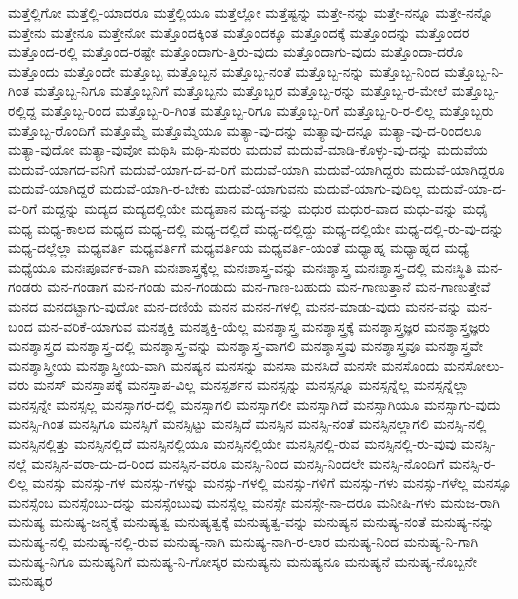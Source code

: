 {ಮತ್ತೆಲ್ಲಿಗೋ
ಮತ್ತೆಲ್ಲಿ-ಯಾದರೂ
ಮತ್ತೆಲ್ಲಿಯೂ
ಮತ್ತೆಲ್ಲೋ
ಮತ್ತೆಷ್ಟನ್ನು
ಮತ್ತೇ-ನನ್ನು
ಮತ್ತೇ-ನನ್ನೂ
ಮತ್ತೇ-ನನ್ನೊ
ಮತ್ತೇನು
ಮತ್ತೇನೂ
ಮತ್ತೇನೋ
ಮತ್ತೊಂದಕ್ಕಿಂತ
ಮತ್ತೊಂದಕ್ಕೂ
ಮತ್ತೊಂದಕ್ಕೆ
ಮತ್ತೊಂದನ್ನು
ಮತ್ತೊಂದರ
ಮತ್ತೊಂದ-ರಲ್ಲಿ
ಮತ್ತೊಂದ-ರಷ್ಟೇ
ಮತ್ತೊಂದಾಗು-ತ್ತಿರು-ವುದು
ಮತ್ತೊಂದಾಗು-ವುದು
ಮತ್ತೊಂದಾ-ದರೊ
ಮತ್ತೊಂದು
ಮತ್ತೊಂದೇ
ಮತ್ತೊಬ್ಬ
ಮತ್ತೊಬ್ಬನ
ಮತ್ತೊಬ್ಬ-ನಂತೆ
ಮತ್ತೊಬ್ಬ-ನನ್ನು
ಮತ್ತೊಬ್ಬ-ನಿಂದ
ಮತ್ತೊಬ್ಬ-ನಿ-ಗಿಂತ
ಮತ್ತೊಬ್ಬ-ನಿಗೂ
ಮತ್ತೊಬ್ಬನಿಗೆ
ಮತ್ತೊಬ್ಬನು
ಮತ್ತೊಬ್ಬರ
ಮತ್ತೊಬ್ಬ-ರನ್ನು
ಮತ್ತೊಬ್ಬ-ರ-ಮೇಲೆ
ಮತ್ತೊಬ್ಬ-ರಲ್ಲಿದ್ದ
ಮತ್ತೊಬ್ಬ-ರಿಂದ
ಮತ್ತೊಬ್ಬ-ರಿ-ಗಿಂತ
ಮತ್ತೊಬ್ಬ-ರಿಗೂ
ಮತ್ತೊಬ್ಬ-ರಿಗೆ
ಮತ್ತೊಬ್ಬ-ರಿ-ರ-ಲಿಲ್ಲ
ಮತ್ತೊಬ್ಬರು
ಮತ್ತೊಬ್ಬ-ರೊಂದಿಗೆ
ಮತ್ತೊಮ್ಮೆ
ಮತ್ತೊಮ್ಮೆಯೂ
ಮತ್ಯಾ-ವು-ದನ್ನು
ಮತ್ಯಾವು-ದನ್ನೂ
ಮತ್ಯಾ-ವು-ದ-ರಿಂದಲೂ
ಮತ್ಯಾ-ವುದೋ
ಮತ್ಯಾ-ವುವೋ
ಮಥಿಸಿ
ಮಥಿ-ಸುವರು
ಮದುವೆ
ಮದುವೆ-ಮಾಡಿ-ಕೊಳ್ಳು-ವು-ದನ್ನು
ಮದುವೆಯ
ಮದುವೆ-ಯಾಗದ-ವನಿಗೆ
ಮದುವೆ-ಯಾಗ-ದ-ವ-ರಿಗೆ
ಮದುವೆ-ಯಾಗಿ
ಮದುವೆ-ಯಾಗಿದ್ದರು
ಮದುವೆ-ಯಾಗಿದ್ದರೂ
ಮದುವೆ-ಯಾಗಿದ್ದರೆ
ಮದುವೆ-ಯಾಗಿ-ರ-ಬೇಕು
ಮದುವೆ-ಯಾಗುವನು
ಮದುವೆ-ಯಾಗು-ವುದಿಲ್ಲ
ಮದುವೆ-ಯಾ-ದ-ವ-ರಿಗೆ
ಮದ್ದನ್ನು
ಮದ್ಯದ
ಮದ್ಯದಲ್ಲಿಯೇ
ಮದ್ಯಪಾನ
ಮದ್ಯ-ವನ್ನು
ಮಧುರ
ಮಧುರ-ವಾದ
ಮಧು-ವನ್ನು
ಮಧೈ
ಮಧ್ಯ
ಮಧ್ಯ-ಕಾಲದ
ಮಧ್ಯದ
ಮಧ್ಯ-ದಲ್ಲಿ
ಮಧ್ಯ-ದಲ್ಲಿದೆ
ಮಧ್ಯ-ದಲ್ಲಿದ್ದು
ಮಧ್ಯ-ದಲ್ಲಿಯೇ
ಮಧ್ಯ-ದಲ್ಲಿ-ರು-ವು-ದನ್ನು
ಮಧ್ಯ-ದಲ್ಲೆಲ್ಲಾ
ಮಧ್ಯವರ್ತಿ
ಮಧ್ಯವರ್ತಿಗೆ
ಮಧ್ಯವರ್ತಿಯ
ಮಧ್ಯವರ್ತಿ-ಯಂತೆ
ಮಧ್ಯಾಹ್ನ
ಮಧ್ಯಾಹ್ನದ
ಮಧ್ಯೆ
ಮಧ್ಯೆಯೂ
ಮನಃಪೂರ್ವಕ-ವಾಗಿ
ಮನಃಶಾಸ್ತ್ರಕ್ಕೆಲ್ಲ
ಮನಃಶಾಸ್ತ್ರ-ವನ್ನು
ಮನಃಶ್ಶಾಸ್ತ್ರ
ಮನಃಶ್ಶಾಸ್ತ್ರ-ದಲ್ಲಿ
ಮನಃಸ್ಥಿತಿ
ಮನ-ಗಂಡರು
ಮನ-ಗಂಡಾಗ
ಮನ-ಗಂಡು
ಮನ-ಗಂಡುದು
ಮನ-ಗಾಣ-ಬಹುದು
ಮನ-ಗಾಣುತ್ತಾನೆ
ಮನ-ಗಾಣುತ್ತೇವೆ
ಮನದ
ಮನದಟ್ಟಾಗು-ವುದೋ
ಮನ-ದಣಿಯೆ
ಮನನ
ಮನನ-ಗಳಲ್ಲಿ
ಮನನ-ಮಾಡು-ವುದು
ಮನನ-ವನ್ನು
ಮನ-ಬಂದ
ಮನ-ವರಿಕೆ-ಯಾಗುವ
ಮನಶ್ಶಕ್ತಿ
ಮನಶ್ಶಕ್ತಿ-ಯೆಲ್ಲ
ಮನಶ್ಶಾಸ್ತ್ರ
ಮನಶ್ಶಾಸ್ತ್ರಕ್ಕೆ
ಮನಶ್ಶಾಸ್ತ್ರಜ್ಞರ
ಮನಶ್ಶಾಸ್ತ್ರಜ್ಞರು
ಮನಶ್ಶಾಸ್ತ್ರದ
ಮನಶ್ಶಾಸ್ತ್ರ-ದಲ್ಲಿ
ಮನಶ್ಶಾಸ್ತ್ರ-ವನ್ನು
ಮನಶ್ಶಾಸ್ತ್ರ-ವಾಗಲಿ
ಮನಶ್ಶಾಸ್ತ್ರವು
ಮನಶ್ಶಾಸ್ತ್ರವೂ
ಮನಶ್ಶಾಸ್ತ್ರವೇ
ಮನಶ್ಶಾಸ್ತ್ರೀಯ
ಮನಶ್ಶಾಸ್ತ್ರೀಯ-ವಾಗಿ
ಮನಷ್ಯನ
ಮನಸನ್ನು
ಮನಸಾ
ಮನಸಿದೆ
ಮನಸೇ
ಮನಸೊಂದು
ಮನಸೋಲು-ವರು
ಮನಸ್
ಮನಸ್ತಾಪಕ್ಕೆ
ಮನಸ್ತಾಪ-ವಿಲ್ಲ
ಮನಸ್ಪರ್ಶನ
ಮನಸ್ಸನ್ನು
ಮನಸ್ಸನ್ನೂ
ಮನಸ್ಸನ್ನೆಲ್ಲ
ಮನಸ್ಸನ್ನೆಲ್ಲಾ
ಮನಸ್ಸನ್ನೇ
ಮನಸ್ಸಲ್ಲ
ಮನಸ್ಸಾಗರ-ದಲ್ಲಿ
ಮನಸ್ಸಾಗಲಿ
ಮನಸ್ಸಾಗಲೀ
ಮನಸ್ಸಾಗಿದೆ
ಮನಸ್ಸಾಗಿಯೂ
ಮನಸ್ಸಾಗು-ವುದು
ಮನಸ್ಸಿ-ಗಿಂತ
ಮನಸ್ಸಿಗೂ
ಮನಸ್ಸಿಗೆ
ಮನಸ್ಸಿಟ್ಟು
ಮನಸ್ಸಿದೆ
ಮನಸ್ಸಿನ
ಮನಸ್ಸಿ-ನಂತೆ
ಮನಸ್ಸಿನಲ್ಲಾಗಲಿ
ಮನಸ್ಸಿ-ನಲ್ಲಿ
ಮನಸ್ಸಿನಲ್ಲಿತ್ತು
ಮನಸ್ಸಿನಲ್ಲಿದೆ
ಮನಸ್ಸಿನಲ್ಲಿಯೂ
ಮನಸ್ಸಿನಲ್ಲಿಯೇ
ಮನಸ್ಸಿನಲ್ಲಿ-ರುವ
ಮನಸ್ಸಿನಲ್ಲಿ-ರು-ವುವು
ಮನಸ್ಸಿ-ನಲ್ಲೆ
ಮನಸ್ಸಿನ-ವರಾ-ದು-ದ-ರಿಂದ
ಮನಸ್ಸಿನ-ವರೂ
ಮನಸ್ಸಿ-ನಿಂದ
ಮನಸ್ಸಿ-ನಿಂದಲೇ
ಮನಸ್ಸಿ-ನೊಂದಿಗೆ
ಮನಸ್ಸಿ-ರ-ಲಿಲ್ಲ
ಮನಸ್ಸು
ಮನಸ್ಸು-ಗಳ
ಮನಸ್ಸು-ಗಳನ್ನು
ಮನಸ್ಸು-ಗಳಲ್ಲಿ
ಮನಸ್ಸು-ಗಳಿಗೆ
ಮನಸ್ಸು-ಗಳು
ಮನಸ್ಸು-ಗಳೆಲ್ಲ
ಮನಸ್ಸೂ
ಮನಸ್ಸೆಂಬ
ಮನಸ್ಸೆಂಬು-ದನ್ನು
ಮನಸ್ಸೆಂಬುವು
ಮನಸ್ಸೆಲ್ಲ
ಮನಸ್ಸೇ
ಮನಸ್ಸೇ-ನಾ-ದರೂ
ಮನೀಷಿ-ಗಳು
ಮನುಜ-ರಾಗಿ
ಮನುಷ್ಯ
ಮನುಷ್ಯ-ಜನ್ಮಕ್ಕೆ
ಮನುಷ್ಯತ್ವ
ಮನುಷ್ಯತ್ವಕ್ಕೆ
ಮನುಷ್ಯತ್ವ-ವನ್ನು
ಮನುಷ್ಯನ
ಮನುಷ್ಯ-ನಂತೆ
ಮನುಷ್ಯ-ನನ್ನು
ಮನುಷ್ಯ-ನಲ್ಲಿ
ಮನುಷ್ಯ-ನಲ್ಲಿ-ರುವ
ಮನುಷ್ಯ-ನಾಗಿ
ಮನುಷ್ಯ-ನಾಗಿ-ರ-ಲಾರ
ಮನುಷ್ಯ-ನಿಂದ
ಮನುಷ್ಯ-ನಿ-ಗಾಗಿ
ಮನುಷ್ಯ-ನಿಗೂ
ಮನುಷ್ಯನಿಗೆ
ಮನುಷ್ಯ-ನಿ-ಗೋಸ್ಕರ
ಮನುಷ್ಯನು
ಮನುಷ್ಯನೂ
ಮನುಷ್ಯನೆ
ಮನುಷ್ಯ-ನೊಬ್ಬನೇ
ಮನುಷ್ಯರ
}
